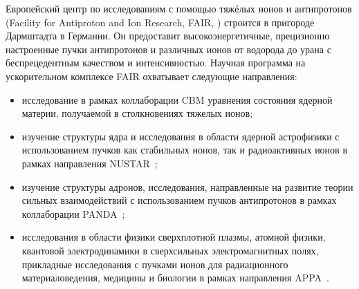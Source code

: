 


Европейский центр по исследованиям с помощью тяжёлых ионов и антипротонов (Facility for Antiproton and Ion Research, FAIR, \cite{FAIR}) строится в пригороде Дармштадта в Германии.
Он предоставит высокоэнергетичные, прецизионно настроенные пучки антипротонов и различных ионов от водорода до урана с беспрецедентным качеством и интенсивностью.
Научная программа на ускорительном комплексе FAIR охватывает следующие направления:
\begin{itemize}
\item исследование в рамках коллаборации CBM уравнения состояния ядерной материи, получаемой в столкновениях тяжелых ионов;
\item изучение структуры ядра и исследования в области ядерной астрофизики с использованием пучков как стабильных ионов, так и радиоактивных ионов в рамках направления NUSTAR~\cite{};
\item изучение структуры адронов, исследования, направленные на развитие теории сильных взаимодействий с использованием пучков антипротонов в рамках коллаборации PANDA~\cite{};
\item исследования в области физики сверхплотной плазмы, атомной физики, квантовой электродинамики в сверхсильных электромагнитных полях, прикладные исследования с пучками ионов для радиационного материаловедения, медицины и биологии в рамках направления APPA~\cite{}.
\end{itemize}


